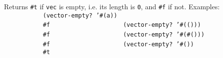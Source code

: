 \begin{entry}{%
 }

  Returns
  \texttt{\#t} if \texttt{vec} is empty, i.e. its length is
  \texttt{0}, and \texttt{\#f} if not.  Examples:
  \texttt{~~~~~~~~~~~(vector-empty?~'\#(a))~~~~~~~~~}\\
  \texttt{~~~~~~~~~~~\#f~~~~~~~~~}
  \texttt{~~~~~~~~~~~(vector-empty?~'\#(()))~~~~~~~~~}\\
  \texttt{~~~~~~~~~~~\#f~~~~~~~~~}
  \texttt{~~~~~~~~~~~(vector-empty?~'\#(\#()))~~~~~~~~~}\\
  \texttt{~~~~~~~~~~~\#f~~~~~~~~~}
  \texttt{~~~~~~~~~~~(vector-empty?~'\#())~~~~~~~~~}\\
  \texttt{~~~~~~~~~~~\#t~~~~~~~~~}
\end{entry}

